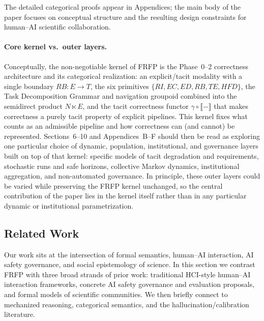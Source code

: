 \documentclass[11pt]{article}
\theoremstyle{definition}
\begin{document}
The detailed categorical proofs appear in Appendices; the main body of the paper focuses on conceptual structure and the resulting design constraints for human--AI scientific collaboration.

\paragraph{Core kernel vs.\ outer layers.}
Conceptually, the non-negotiable kernel of FRFP is the Phase~0–2 correctness architecture and its categorical realization: an explicit/tacit modality with a single boundary $RB : E \to T$, the six primitives $\{RI, EC, ED, RB, TE, HFD\}$, the Task Decomposition Grammar and navigation groupoid combined into the semidirect product $N \ltimes E$, and the tacit correctness functor $\gamma \circ \llbracket - \rrbracket$ that makes correctness a purely tacit property of explicit pipelines.
This kernel fixes what counts as an admissible pipeline and how correctness can (and cannot) be represented.
Sections~6--10 and Appendices~B--F should then be read as exploring one particular choice of dynamic, population, institutional, and governance layers built on top of that kernel: specific models of tacit degradation and requirements, stochastic runs and safe horizons, collective Markov dynamics, institutional aggregation, and non-automated governance.
In principle, these outer layers could be varied while preserving the FRFP kernel unchanged, so the central contribution of the paper lies in the kernel itself rather than in any particular dynamic or institutional parametrization.

\subsection{Related Work}

Our work sits at the intersection of formal semantics, human--AI interaction, AI safety governance, and social epistemology of science. In this section we contrast FRFP with three broad strands of prior work: traditional HCI-style human--AI interaction frameworks, concrete AI safety governance and evaluation proposals, and formal models of scientific communities. We then briefly connect to mechanized reasoning, categorical semantics, and the hallucination/calibration literature.
\end{document}
